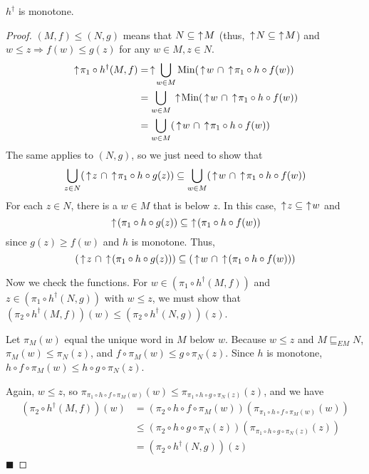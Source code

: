 \begin{proposition}
$h^\dagger$ is monotone.
\end{proposition}
\begin{proof}
$(M, f)\leq (N, g)$ means that $N\subseteq\,\,\uparrow\! M$ (thus, $\,\uparrow\! N\subseteq\,\,\uparrow\! M$)
and $w\leq z \Rightarrow f(w)\leq g(z)$ for any 
$w\in M, z\in N$.
\begin{align*}
\ua \pi_1\circ h^\dagger(M, f) &= \ua \bigcup_{w\in M} \Min(\ua w\  \cap \ua \pi_1 \circ h\circ f(w)) \\
&= \bigcup_{w\in M} \ua\Min(\ua w\ \cap \ua \pi_1 \circ h\circ f(w)) \\
&= \bigcup_{w\in M} (\ua w\ \cap \ua \pi_1 \circ h\circ f(w))
\end{align*}
The same applies to $(N, g)$, so we just need to show that
\begin{align*} 
\bigcup_{z\in N} (\,\uparrow\! z\ \cap \,\uparrow\! \pi_1 \circ h\circ g(z)) \subseteq \bigcup_{w\in M} (\,\uparrow\! w\ \cap \,\uparrow\! \pi_1 \circ h\circ f(w))
\end{align*}
For each $z\in N$, there is a $w\in M$ that is below $z$.  In this case, $\,\uparrow\! z \subseteq\, \,\uparrow\! w$ and 
\[\,\uparrow\! (\pi_1\circ h\circ g(z))\subseteq\, \,\uparrow\! (\pi_1\circ h\circ f(w))\] since
$g(z)\geq f(w)$ and $h$ is monotone.  Thus, \[(\,\uparrow\! z\ \cap \,\uparrow\! (\pi_1 \circ h\circ g(z))) \subseteq (\,\uparrow\! w\ \cap \,\uparrow\! (\pi_1 \circ h\circ f(w)))\]

Now we check the functions.  For $w\in(\pi_1\circ h^\dagger(M,f))$ and $z\in(\pi_1\circ h^\dagger(N,g))$ with $w\leq z$,
we must show that $(\pi_2\circ h^\dagger(M,f))(w) \leq (\pi_2\circ h^\dagger(N,g))(z)$.

Let $\pi_M(w)$ equal the unique word in $M$ below $w$.
Because $w\leq z$ and $M\sqsubseteq_{EM} N$, ${\pi_M (w) \leq \pi_N (z)}$, and 
$f\circ \pi_M (w) \leq g\circ \pi_N (z)$.  Since $h$ is monotone,
$h\circ f\circ \pi_M (w) \leq h\circ g\circ \pi_N (z)$.

Again, $w\leq z$, so $\pi_{\pi_1 \circ h\circ f\circ \pi_M(w)}(w)\leq \pi_{\pi_1 \circ h\circ g\circ \pi_N(z)}(z)$, and we have
\begin{align*}
(\pi_2\circ h^\dagger(M,f))(w) 
&= (\pi_2\circ h\circ f\circ\pi_M(w))(\pi_{\pi_1\circ h\circ f\circ\pi_M(w)}(w)) \\
& \leq (\pi_2\circ h\circ g\circ\pi_N(z))(\pi_{\pi_1\circ h\circ g\circ\pi_N(z)}(z)) \\ 
&= (\pi_2\circ h^\dagger(N,g))(z)
\end{align*} \hfill$\blacksquare$
\end{proof}

